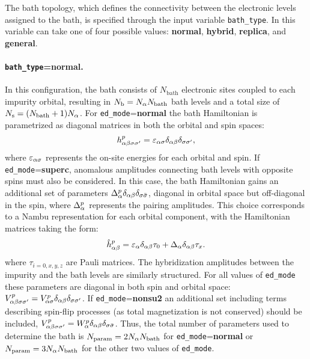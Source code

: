 \documentclass[edipack_sp.tex]{subfiles}
\begin{document}
The bath topology, which defines the connectivity between the
electronic levels assigned to the bath, is specified
through the input variable {\tt bath\_type}. In \NAME this variable can take one of four possible values: {\bf normal}, {\bf hybrid}, {\bf replica}, and {\bf general}.

\paragraph{{\tt bath\_type}={\bf normal}.} In this configuration, the
bath consists of $N_\mathrm{bath}$
electronic sites coupled to each impurity orbital, resulting
in $N_\mathrm{b} = N_\alpha N_\mathrm{bath}$ bath levels and a total size of $N_\mathrm{s}=(N_\mathrm{bath}+1)N_\alpha$.
For {\tt ed\_mode}={\bf normal} the bath Hamiltonian is parametrized as diagonal matrices in both the orbital and spin spaces:
$$
h^p_{\alpha\beta\sigma\sigma'}=\varepsilon_{\alpha\sigma}\delta_{\alpha\beta}\delta_{\sigma\sigma'},
$$
where $\varepsilon_{\alpha\sigma}$ represents  the on-site energies for each orbital and spin. 
%
If {\tt ed\_mode}={\bf superc},  anomalous
amplitudes connecting bath levels with opposite spins must also be
considered. In this case, the bath Hamiltonian gains 
an additional set of parameters $\Delta^p_{\alpha}\delta_{\alpha\beta}\delta_{\sigma \bar{\sigma}}$, diagonal in orbital space but
off-diagonal in the spin, where $\Delta^p_\alpha$ represents the pairing amplitudes. 
This choice corresponds to a Nambu representation for each orbital component,
with the Hamiltonian matrices taking the form:
$$
\hat{h}^p_{\alpha\beta} = \varepsilon_{\alpha}\delta_{\alpha\beta}\tau_0 +
\Delta_{\alpha}\delta_{\alpha\beta}\tau_x .
$$
where $\tau_{i=0,x,y,z}$ are Pauli matrices.
%
The hybridization amplitudes between the impurity and the bath levels
are similarly structured. For all values of {\tt ed\_mode} these
parameters are diagonal in both
spin and orbital space: $V^p_{\alpha\beta\sigma\sigma'}=V^p_{\alpha\sigma}\delta_{\alpha\beta}\delta_{\sigma\sigma'}$.
%
If {\tt ed\_mode}={\bf nonsu2}  an additional set including terms describing spin-flip processes (as total magnetization is not conserved) should be included, $V^p_{\alpha\beta\sigma\sigma'} =
W^p_{\alpha}\delta_{\alpha\beta}\delta_{\sigma \bar{\sigma}}$. 
%
Thus, the total number of parameters used to determine the bath is $N_\mathrm{param}=2N_\alpha N_\mathrm{bath}$ for {\tt ed\_mode}={\bf normal} or $N_\mathrm{param}=3N_\alpha N_\mathrm{bath}$ for the other two values of {\tt ed\_mode}.
\end{document}
